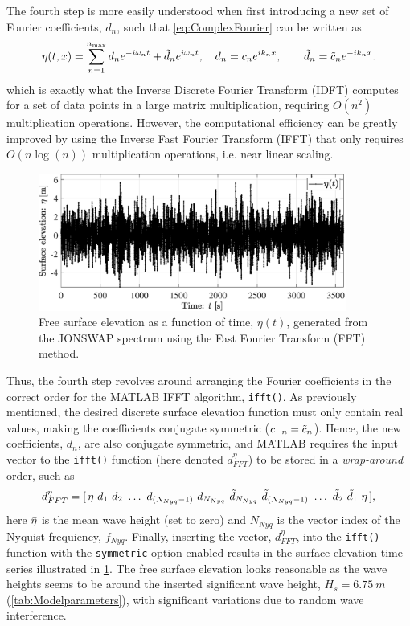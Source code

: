 The fourth step is more easily understood when first introducing a new set of Fourier coefficients, $d_n$, such that \cref{eq:ComplexFourier} can be written as
\begin{equation}
        \eta(t,x) = \sum_{n=1}^{n_{\text{max}}} d_n e^{-i\omega_n t} + \Tilde{d}_n e^{i\omega_n t}
    \label{eq:ComplexFourier2}, \quad d_n = c_n e^{ik_n x}, \qquad \Tilde{d}_n = \Tilde{c}_n e^{-ik_n x}.
\end{equation}
which is exactly what the Inverse Discrete Fourier Transform (IDFT) computes for a set of data points in a large matrix multiplication, requiring $O(n^2)$ multiplication operations. However, the computational efficiency can be greatly improved by using the Inverse Fast Fourier Transform (IFFT) that only requires $O(n\log{(n)})$ multiplication operations, i.e. near linear scaling.
\begin{figure}[htbp]
    \centering
    \includegraphics[width=0.9\textwidth]{Figures/Plots/SurfaceElevation.eps}
    \caption{Free surface elevation as a function of time, $\eta(t)$, generated from the JONSWAP spectrum using the Fast Fourier Transform (FFT) method.}
    \label{fig:SurfaceElevation}
\end{figure}

Thus, the fourth step revolves around arranging the Fourier coefficients in the correct order for the MATLAB IFFT algorithm, \verb+ifft()+. As previously mentioned, the desired discrete surface elevation function must only contain real values, making the coefficients conjugate symmetric ($c_{-n}=\Tilde{c}_n$). Hence, the new coefficients, $d_n$, are also conjugate symmetric, and MATLAB requires the input vector to the \verb+ifft()+ function (here denoted $d_{FFT}^\eta$) to be stored in a \textit{wrap-around} order, such as
\begin{equation}
    d_{FFT}^\eta = [\, \Bar{\eta}\ d_1\ d_2\ \dots \ d_{(N_{Nyq}-1)} \ d_{N_{Nyq}} \ \Tilde{d}_{N_{Nyq}} \ \Tilde{d}_{(N_{Nyq}-1)} \ \dots \  \Tilde{d}_2 \ \Tilde{d}_1 \ \Bar{\eta} \, ], 
    \label{eq:dfftvector}
\end{equation} 
here $\Bar{\eta}$ is the mean wave height (set to zero) and $N_{Nyq}$ is the vector index of the Nyquist frequiency, $f_{Nyq}$. Finally, inserting the vector, $d_{FFT}^\eta$, into the \verb+ifft()+ function with the \verb+symmetric+ option enabled results in the surface elevation time series illustrated in \cref{fig:SurfaceElevation}. The free surface elevation looks reasonable as the wave heights seems to be around the inserted significant wave height, $H_s=\SI{6.75}{m}$ (\cref{tab:Modelparameters}), with significant variations due to random wave interference.   


